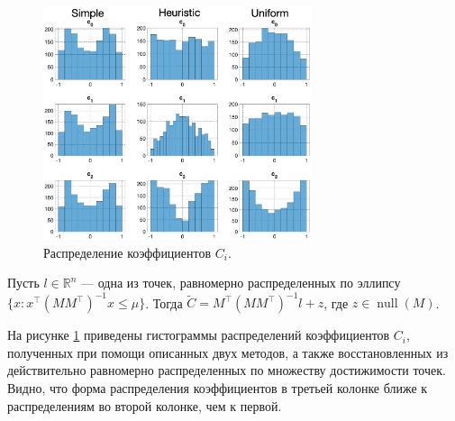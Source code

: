 \documentclass[../main.tex]{subfiles}
\begin{document}
    \begin{figure}[ht]
  	\centering
  	\includegraphics[width=0.7\textwidth]{images/three_coefficients_distribution.eps}
  	\caption{Распределение коэффициентов $C_i$.}
  	\label{fig:ap:three_coefficients_distribution}
  \end{figure}
  
  Пусть $l\in \mathbb{R}^{n}$ --- одна из точек, равномерно распределенных по эллипсу $\{x: x^{\top} (M M^{\top})^{-1} x \leqslant \mu \}$.
  Тогда $\widetilde{C} = M^{\top} (M M^{\top})^{-1} l + z$, где $z \in \operatorname{null}(M)$.
  
  На рисунке \ref{fig:ap:three_coefficients_distribution} приведены гистограммы распределений коэффициентов $C_i$, полученных при помощи описанных двух методов, а также восстановленных из действительно равномерно распределенных по множеству достижимости точек. 
  Видно, что форма распределения коэффициентов в третьей колонке ближе к распределениям во второй колонке, чем к первой. 
  
\end{document}
